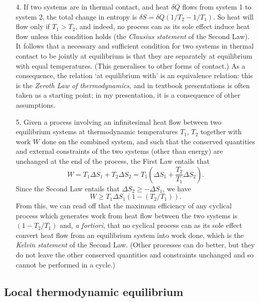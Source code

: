 \documentclass[12pt]{article}
\newcommand{\be}{\begin{equation}}
\newcommand{\ee}{\end{equation}}
\begin{document}
\begin{enumerate}
\item[4.] If two systems are in thermal contact, and heat $\delta Q$ flows from system 1 to system 2, the total change in entropy is $\delta S = \delta Q (1/T_2 - 1/T_1)$. So heat will flow only if $T_1>T_2$, and indeed, no process can as its sole effect induce heat flow unless this condition holds (the \emph{Clausius statement} of the Second Law). It follows that a necessary and sufficient condition for two systems in thermal contact to be jointly at equilibrium is that they are separately at equilibrium with equal temperatures. (This generalises to other forms of contact.) As a consequence, the relation `at equilibrium with' is an equivalence relation: this is the \emph{Zeroth Law of thermodynamics}, and in textbook presentations is often taken as a starting point; in my presentation, it is a consequence of other assumptions.
\item [5.] Given a process involving an infinitesimal heat flow between two equilibrium systems at thermodynamic temperatures $T_1$, $T_2$ together with work $W$ done on the combined system, and such that the conserved quantities and external constraints of the two systems (other than energy) are unchanged at the end of the process, the First Law entails that
\be
W = T_1 \Delta S_1 + T_2 \Delta S_2 = T_1 \left( \Delta S_1 + \frac{T_2}{T_1}\Delta S_2\right).
\ee
Since the Second Law entails that $\Delta S_2 \geq - \Delta S_1$, we have
\be
W \geq T_1 \Delta S_1 \left (1 - (T_2/T_1)\right).
\ee
From this, we can read off that the maximum efficiency of any cyclical process which generates work from heat flow between the two systems is $(1-T_2/T_1)$ and, \emph{a fortiori}, that no cyclical process can as its sole effect convert heat flow from an equilibrium system into work done, which is the \emph{Kelvin statement} of the Second Law. (Other processes can do better, but they do not leave the other conserved quantities and constraints unchanged and so cannot be performed in a cycle.)
\end{enumerate}

\subsection{Local thermodynamic equilibrium}
\end{document}
